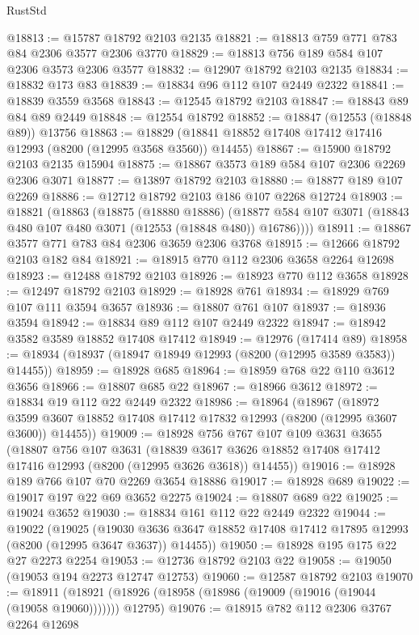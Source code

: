 \begin{lexlean}{RustStd}
\begin{coremodule}
@18813 := @15787 @18792 @2103 @2135
@18821 := @18813 @759 @771 @783 @84 @2306 @3577 @2306 @3770
@18829 := @18813 @756 @189 @584 @107 @2306 @3573 @2306 @3577
@18832 := @12907 @18792 @2103 @2135
@18834 := @18832 @173 @83
@18839 := @18834 @96 @112 @107 @2449 @2322
@18841 := @18839 @3559 @3568
@18843 := @12545 @18792 @2103
@18847 := @18843 @89 @84 @89 @2449
@18848 := @12554 @18792
@18852 := @18847 (@12553 (@18848 @89)) @13756
@18863 := @18829 (@18841 @18852 @17408 @17412 @17416 @12993 (@8200 (@12995 @3568 @3560)) @14455)
@18867 := @15900 @18792 @2103 @2135 @15904
@18875 := @18867 @3573 @189 @584 @107 @2306 @2269 @2306 @3071
@18877 := @13897 @18792 @2103
@18880 := @18877 @189 @107 @2269
@18886 := @12712 @18792 @2103 @186 @107 @2268 @12724
@18903 := @18821
    (@18863
      (@18875
        (@18880 @18886)
        (@18877 @584 @107 @3071 (@18843 @480 @107 @480 @3071 (@12553 (@18848 @480)) @16786))))
@18911 := @18867 @3577 @771 @783 @84 @2306 @3659 @2306 @3768
@18915 := @12666 @18792 @2103 @182 @84
@18921 := @18915 @770 @112 @2306 @3658 @2264 @12698
@18923 := @12488 @18792 @2103
@18926 := @18923 @770 @112 @3658
@18928 := @12497 @18792 @2103
@18929 := @18928 @761
@18934 := @18929 @769 @107 @111 @3594 @3657
@18936 := @18807 @761 @107
@18937 := @18936 @3594
@18942 := @18834 @89 @112 @107 @2449 @2322
@18947 := @18942 @3582 @3589 @18852 @17408 @17412
@18949 := @12976 (@17414 @89)
@18958 := @18934 (@18937 (@18947 @18949 @12993 (@8200 (@12995 @3589 @3583)) @14455))
@18959 := @18928 @685
@18964 := @18959 @768 @22 @110 @3612 @3656
@18966 := @18807 @685 @22
@18967 := @18966 @3612
@18972 := @18834 @19 @112 @22 @2449 @2322
@18986 := @18964
    (@18967
      (@18972 @3599 @3607 @18852 @17408 @17412 @17832 @12993 (@8200 (@12995 @3607 @3600)) @14455))
@19009 := @18928
    @756
    @767
    @107
    @109
    @3631
    @3655
    (@18807
      @756
      @107
      @3631
      (@18839 @3617 @3626 @18852 @17408 @17412 @17416 @12993 (@8200 (@12995 @3626 @3618)) @14455))
@19016 := @18928 @189 @766 @107 @70 @2269 @3654 @18886
@19017 := @18928 @689
@19022 := @19017 @197 @22 @69 @3652 @2275
@19024 := @18807 @689 @22
@19025 := @19024 @3652
@19030 := @18834 @161 @112 @22 @2449 @2322
@19044 := @19022
    (@19025
      (@19030 @3636 @3647 @18852 @17408 @17412 @17895 @12993 (@8200 (@12995 @3647 @3637)) @14455))
@19050 := @18928 @195 @175 @22 @27 @2273 @2254
@19053 := @12736 @18792 @2103 @22
@19058 := @19050 (@19053 @194 @2273 @12747 @12753)
@19060 := @12587 @18792 @2103
@19070 := @18911
    (@18921 (@18926 (@18958 (@18986 (@19009 (@19016 (@19044 (@19058 @19060))))))) @12795)
@19076 := @18915 @782 @112 @2306 @3767 @2264 @12698

\end{coremodule}
\end{lexlean}
